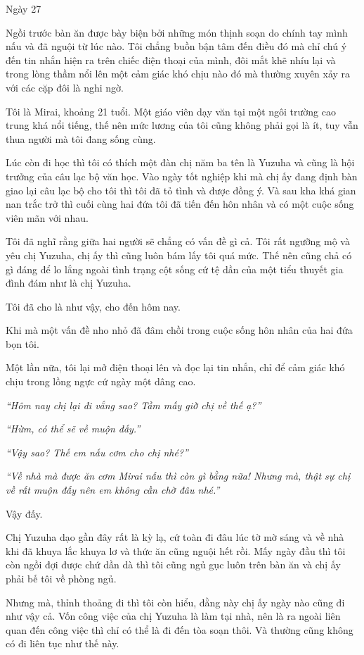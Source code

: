{Ngày 27}
{
Ngồi trước bàn ăn được bày biện bởi những món thịnh soạn do chính tay
mình nấu và đã nguội từ lúc nào. Tôi chẳng buồn bận tâm đến điều đó mà
chỉ chú ý đến tin nhắn hiện ra trên chiếc điện thoại của mình, đôi mắt
khẽ nhíu lại và trong lòng thầm nổi lên một cảm giác khó chịu nào đó mà
thường xuyên xảy ra với các cặp đôi là nghi ngờ.

Tôi là Mirai, khoảng 21 tuổi. Một giáo viên dạy văn tại một ngôi trường
cao trung khá nổi tiếng, thế nên mức lương của tôi cũng không phải gọi
là ít, tuy vẫn thua người mà tôi đang sống cùng.

Lúc còn đi học thì tôi có thích một đàn chị năm ba tên là Yuzuha và cũng
là hội trưởng của câu lạc bộ văn học. Vào ngày tốt nghiệp khi mà chị ấy
đang định bàn giao lại câu lạc bộ cho tôi thì tôi đã tỏ tình và được
đồng ý. Và sau kha khá gian nan trắc trở thì cuối cùng hai đứa tôi đã
tiến đến hôn nhân và có một cuộc sống viên mãn với nhau.

Tôi đã nghĩ rằng giữa hai người sẽ chẳng có vấn đề gì cả. Tôi rất ngưỡng
mộ và yêu chị Yuzuha, chị ấy thì cũng luôn bám lấy tôi quá mức. Thế nên
cũng chả có gì đáng để lo lắng ngoài tình trạng cột sống cứ tệ dần của
một tiểu thuyết gia đình đám như là chị Yuzuha.

Tôi đã cho là như vậy, cho đến hôm nay.

Khi mà một vấn đề nho nhỏ đã đâm chồi trong cuộc sống hôn nhân của hai
đứa bọn tôi.

Một lần nữa, tôi lại mở điện thoại lên và đọc lại tin nhắn, chỉ để cảm
giác khó chịu trong lồng ngực cứ ngày một dâng cao.

\emph{``Hôm nay chị lại đi vắng sao? Tầm mấy giờ chị về thế ạ?''}

\emph{``Hừm, có thể sẽ về muộn đấy.''}

\emph{``Vậy sao? Thế em nấu cơm cho chị nhé?''}

\emph{``Về nhà mà được ăn cơm Mirai nấu thì còn gì bằng nữa! Nhưng mà,
    thật sự chị về rất muộn đấy nên em không cần chờ đâu nhé.''}

Vậy đấy.

Chị Yuzuha dạo gần đây rất là kỳ lạ, cứ toàn đi đâu lúc tờ mờ sáng và về
nhà khi đã khuya lắc khuya lơ và thức ăn cũng nguội hết rồi. Mấy ngày
đầu thì tôi còn ngồi đợi được chứ dần dà thì tôi cũng ngủ gục luôn trên
bàn ăn và chị ấy phải bế tôi về phòng ngủ.

Nhưng mà, thỉnh thoảng đi thì tôi còn hiểu, đằng này chị ấy ngày nào
cũng đi như vậy cả. Vốn công việc của chị Yuzuha là làm tại nhà, nên là
ra ngoài liên quan đến công việc thì chỉ có thể là đi đến tòa soạn thôi.
Và thường cũng không có đi liên tục như thế này.

}

